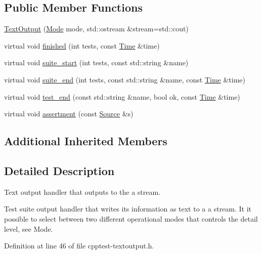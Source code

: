 \subsection*{Public Member Functions}
\begin{DoxyCompactItemize}
\item 
\mbox{\hyperlink{class_test_1_1_text_output_ab9bdd9b2d9b362ca5fb148b766ecdd02}{Text\+Output}} (\mbox{\hyperlink{class_test_1_1_text_output_ae7b22c9458e6c566996bf4517c73feb1}{Mode}} mode, std\+::ostream \&stream=std\+::cout)
\item 
virtual void \mbox{\hyperlink{class_test_1_1_text_output_a9dcf13d9714a2774230386ef3215b701}{finished}} (int tests, const \mbox{\hyperlink{class_test_1_1_time}{Time}} \&time)
\item 
virtual void \mbox{\hyperlink{class_test_1_1_text_output_a0b6479918ee7f0501dfcdfcbc7c9d190}{suite\+\_\+start}} (int tests, const std\+::string \&name)
\item 
virtual void \mbox{\hyperlink{class_test_1_1_text_output_a84efd3536702a815325590cc8837dbb2}{suite\+\_\+end}} (int tests, const std\+::string \&name, const \mbox{\hyperlink{class_test_1_1_time}{Time}} \&time)
\item 
virtual void \mbox{\hyperlink{class_test_1_1_text_output_a0ff333537e85d680740c72dd46cd2e7e}{test\+\_\+end}} (const std\+::string \&name, bool ok, const \mbox{\hyperlink{class_test_1_1_time}{Time}} \&time)
\item 
virtual void \mbox{\hyperlink{class_test_1_1_text_output_a8110f86aa00f783fc5a91ec2f59a7998}{assertment}} (const \mbox{\hyperlink{class_test_1_1_source}{Source}} \&s)
\end{DoxyCompactItemize}
\subsection*{Additional Inherited Members}


\subsection{Detailed Description}
Text output handler that outputs to the a stream. 

Test suite output handler that writes its information as text to a a stream. It it possible to select between two different operational modes that controls the detail level, see Mode. 

Definition at line 46 of file cpptest-\/textoutput.\+h.



